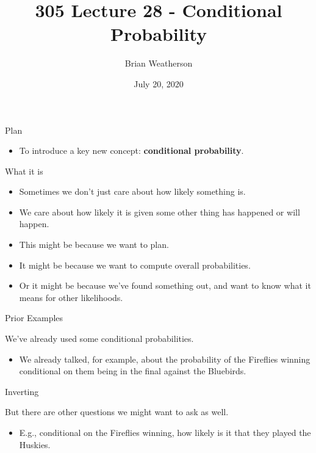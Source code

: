 \documentclass[
  ignorenonframetext,
]{beamer}
\title{305 Lecture 28 - Conditional Probability}
\author{Brian Weatherson}
\date{July 20, 2020}
\providecommand{\tightlist}{%
  \setlength{\itemsep}{0pt}\setlength{\parskip}{0pt}}
\renewcommand{\,}{\text{, }}
\begin{document}
\frame{\titlepage}

\begin{frame}{Plan}
\protect\hypertarget{plan}{}

\begin{itemize}
\tightlist
\item
  To introduce a key new concept: \textbf{conditional probability}.
\end{itemize}

\end{frame}

\begin{frame}{What it is}
\protect\hypertarget{what-it-is}{}

\begin{itemize}
\tightlist
\item
  Sometimes we don't just care about how likely something is.
\item
  We care about how likely it is given some other thing has happened or
  will happen. \pause
\item
  This might be because we want to plan. \pause
\item
  It might be because we want to compute overall probabilities. \pause
\item
  Or it might be because we've found something out, and want to know
  what it means for other likelihoods.
\end{itemize}

\end{frame}

\begin{frame}{Prior Examples}
\protect\hypertarget{prior-examples}{}

We've already used some conditional probabilities.

\begin{itemize}
\tightlist
\item
  We already talked, for example, about the probability of the Fireflies
  winning conditional on them being in the final against the Bluebirds.
\end{itemize}

\end{frame}

\begin{frame}{Inverting}
\protect\hypertarget{inverting}{}

But there are other questions we might want to ask as well.

\begin{itemize}[<+->]
\tightlist
\item
  E.g., conditional on the Fireflies winning, how likely is it that they
  played the Huskies.
\end{itemize}

\end{frame}
\end{document}
